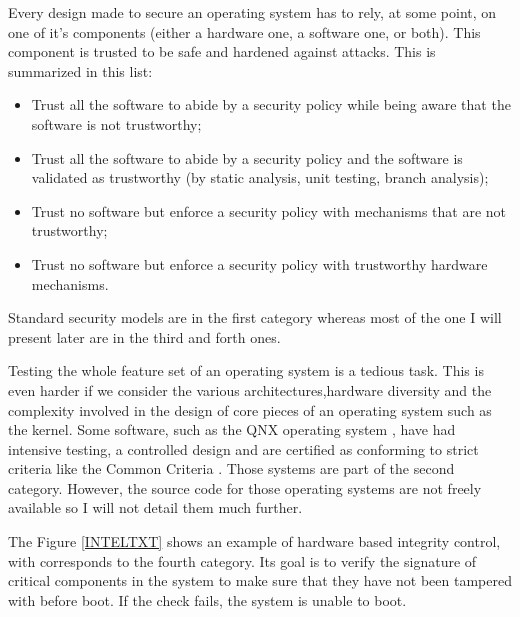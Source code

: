 \documentclass[pdftex,a4paper,titlepage,11pt]{article}
\begin{document}
Every design made to secure an operating system has to rely, at some point, on
one of it's components (either a hardware one, a software one, or both). This
component is trusted to be safe and hardened against attacks. This is summarized
in this list:

\begin{itemize}
	\item Trust all the software to abide by a security policy while being aware
that the software is not trustworthy;
	\item Trust all the software to abide by a security policy and the software
is validated as trustworthy (by static analysis, unit testing, branch analysis);
	\item Trust no software but enforce a security policy with mechanisms that
are not trustworthy;
	\item Trust no software but enforce a security policy with trustworthy
hardware mechanisms.
\end{itemize}

\smallskip

Standard security models are in the first category whereas most of the one I
will present later are in the third and forth ones.

\bigskip

Testing the whole feature set of an operating system is a tedious task. This is
even harder if we consider the various architectures,hardware diversity and the
complexity involved in the design of core pieces of an operating system such as
the kernel. Some software, such as the QNX operating system
\cite{qnxoperatingsystem}, have had
intensive testing, a controlled design and are certified as conforming to strict
criteria like the Common Criteria \cite{commoncriteria}. Those systems are part
of the
second category. However, the source code for those operating systems are not
freely available so I will not detail them much further.

\bigskip

The Figure \ref{INTELTXT} \cite{inteltxt} shows an example of hardware based
integrity control,
with corresponds to the fourth category. Its goal is to verify the signature
of critical components in the system to make sure that they have not been
tampered with before boot. If the check fails, the system is unable to boot.
\end{document}
